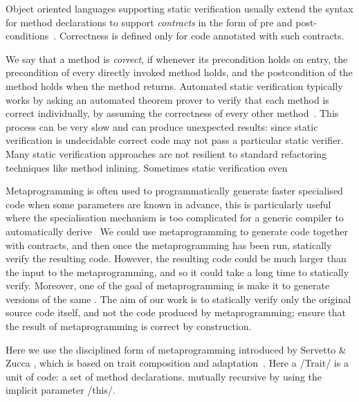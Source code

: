 \noindent Object oriented languages supporting static verification usually extend the syntax for method declarations
to support \emph{contracts} in the form of pre and post-conditions~\cite{Meyer:1988:OSC:534929}.
Correctness is defined only for code annotated with such contracts.

We say that a method is \emph{correct}, if whenever its precondition holds on entry, the precondition of every directly invoked method holds, and the postcondition of the method holds when the method returns. Automated static verification typically works by asking an automated theorem prover to verify that each method is correct individually, by assuming the correctness of every other method~\cite{barnett2004spec}. This process can be very slow and can produce unexpected results: since static verification is undecidable correct code may not pass a particular static verifier.
Many static verification approaches are not resilient to
standard refactoring techniques like 
method inlining. Sometimes static verification even 

Metaprogramming is often used to programmatically generate faster specialised code when some parameters are known in advance, this is particularly useful where the specialisation mechanism is too complicated for a generic compiler to automatically derive~\cite{Ofenbeck:2017:SGP:3136040.3136060}
We could use metaprogramming to generate code together with contracts, and then once the metaprogramming has been run,
statically verify the resulting code. 
However, the resulting code could be much larger than the input to the metaprogramming, and so it could take a long time to statically verify.
Moreover, one of the  goal of metaprogramming is  make it  to generate  versions of the same  .
The aim of our work is to statically verify only the original source code itself, and not the code produced by metaprogramming;
ensure that the result of metaprogramming is correct by construction.

Here we use the disciplined form of metaprogramming introduced by Servetto \& Zucca \cite{servetto2014meta}, which is based on trait composition and adaptation~\cite{scharli2003traits}.
Here a /Trait/ is a unit of code: a set of method declarations.
mutually recursive by using the implicit parameter /this/.

